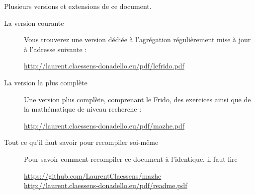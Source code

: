 
\thispagestyle{empty}

Plusieurs versions et extensions de ce document.
\begin{description}

    \item[La version courante] 

        Vous trouverez une version dédiée à l'agrégation régulièrement mise à jour à l'adresse suivante :
        \begin{center}
            \url{http://laurent.claessens-donadello.eu/pdf/lefrido.pdf}
        \end{center}


    \item[La version la plus complète]

        Une version plus complète, comprenant le Frido, des exercices ainsi que de la mathématique de niveau recherche :
        \begin{center}
        \url{http://laurent.claessens-donadello.eu/pdf/mazhe.pdf}
        \end{center}

    \item[Tout ce qu'il faut savoir pour recompiler soi-même]
        Pour savoir comment recompiler ce document à l'identique, il faut lire
        \begin{center}
            \url{https://github.com/LaurentClaessens/mazhe}\\
            \url{http://laurent.claessens-donadello.eu/pdf/readme.pdf}
        \end{center}

\end{description}

